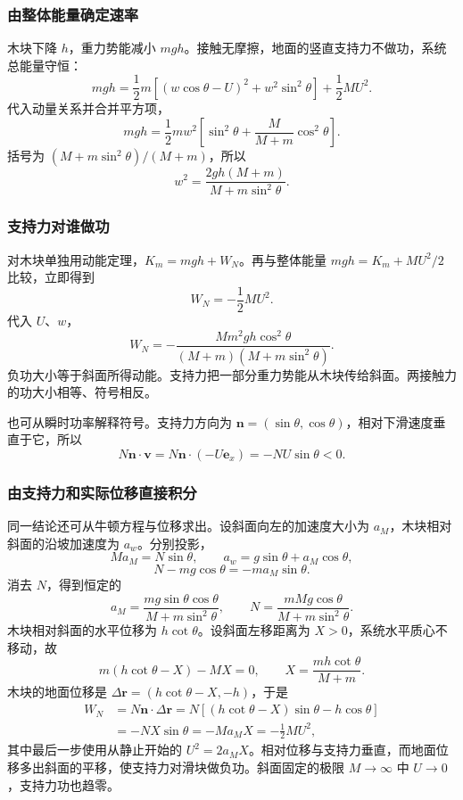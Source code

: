 \documentclass[UTF8,fontset=fandol,a4paper,11pt]{ctexart}
\newcommand{\vect}[1]{\bm{#1}}
\begin{document}
\subsubsection*{由整体能量确定速率}
木块下降 $h$，重力势能减小 $mgh$。接触无摩擦，地面的竖直支持力不做功，系统总能量守恒：
\[
mgh=\frac12m\left[(w\cos\theta-U)^2+w^2\sin^2\theta\right]
+\frac12MU^2.
\]
代入动量关系并合并平方项，
\[
mgh=\frac12m w^2
\left[\sin^2\theta+\frac{M}{M+m}\cos^2\theta\right].
\]
括号为 $(M+m\sin^2\theta)/(M+m)$，所以
\[
w^2=\frac{2gh(M+m)}{M+m\sin^2\theta}.
\]

\subsubsection*{支持力对谁做功}
对木块单独用动能定理，$K_m=mgh+W_N$。再与整体能量 $mgh=K_m+MU^2/2$ 比较，立即得到
\[
W_N=-\frac12MU^2.
\]
代入 $U$、$w$，
\[
\boxed{W_N=
-\frac{Mm^2gh\cos^2\theta}
{(M+m)(M+m\sin^2\theta)}}.
\]
负功大小等于斜面所得动能。支持力把一部分重力势能从木块传给斜面。两接触力的功大小相等、符号相反。

也可从瞬时功率解释符号。支持力方向为
$\vect n=(\sin\theta,\cos\theta)$，相对下滑速度垂直于它，所以
\[
N\vect n\cdot\vect v
=N\vect n\cdot(-U\vect e_x)=-NU\sin\theta<0.
\]
\subsubsection*{由支持力和实际位移直接积分}
同一结论还可从牛顿方程与位移求出。设斜面向左的加速度大小为 $a_M$，木块相对斜面的沿坡加速度为 $a_w$。分别投影，
\[
Ma_M=N\sin\theta,\qquad
a_w=g\sin\theta+a_M\cos\theta,
\]
\[
N-mg\cos\theta=-ma_M\sin\theta.
\]
消去 $N$，得到恒定的
\[
a_M=\frac{mg\sin\theta\cos\theta}{M+m\sin^2\theta},\qquad
N=\frac{mMg\cos\theta}{M+m\sin^2\theta}.
\]
木块相对斜面的水平位移为 $h\cot\theta$。设斜面左移距离为 $X>0$，系统水平质心不移动，故
\[
m(h\cot\theta-X)-MX=0,\qquad
X=\frac{mh\cot\theta}{M+m}.
\]
木块的地面位移是 $\Delta\vect r=(h\cot\theta-X,-h)$，于是
\[
\begin{aligned}
W_N&=N\vect n\cdot\Delta\vect r
=N[(h\cot\theta-X)\sin\theta-h\cos\theta]\\
&=-NX\sin\theta=-Ma_MX=-\frac12MU^2,
\end{aligned}
\]
其中最后一步使用从静止开始的 $U^2=2a_MX$。相对位移与支持力垂直，而地面位移多出斜面的平移，使支持力对滑块做负功。斜面固定的极限 $M\to\infty$ 中 $U\to0$，支持力功也趋零。
\end{document}

